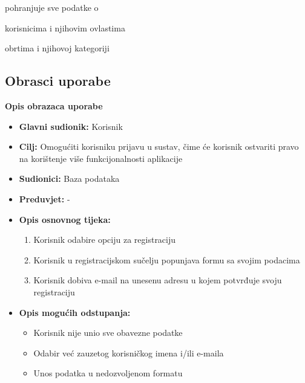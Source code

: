 \begin{packed_enum}
            \item  {}
			\begin{packed_enum}
				\item pohranjuje sve podatke o 
                \begin{packed_enum}
				    \item  korisnicima i njihovim ovlastima
				    \item  obrtima i njihovoj kategoriji
				\end{packed_enum}
			\end{packed_enum}
        \end{packed_enum}
	\eject 
    
    \subsection{Obrasci uporabe}
		\textbf{Opis obrazaca uporabe}
			
	    	\noindent{}
				\begin{itemize}
					\item \textbf{Glavni sudionik: } Korisnik 
					\item \textbf{Cilj: }Omogućiti korisniku prijavu u sustav, čime će korisnik ostvariti pravo na  korištenje više funkcijonalnosti aplikacije 
					\item \textbf{Sudionici: } Baza podataka 
					\item \textbf{Preduvjet: } - 
					\item \textbf{Opis osnovnog tijeka: }
					\begin{enumerate}
						\item Korisnik odabire opciju za registraciju
						\item Korisnik u registracijskom sučelju popunjava formu sa svojim podacima
						\item Korisnik dobiva e-mail na unesenu adresu u kojem potvrđuje svoju registraciju
					\end{enumerate}
					\item \textbf{Opis mogućih odstupanja:}
					\begin{itemize}
						\item Korisnik nije unio sve obavezne podatke
						\item Odabir već zauzetog korisničkog imena i/ili e-maila
						\item Unos podatka u nedozvoljenom formatu
					\end{itemize}
				\end{itemize}
					
